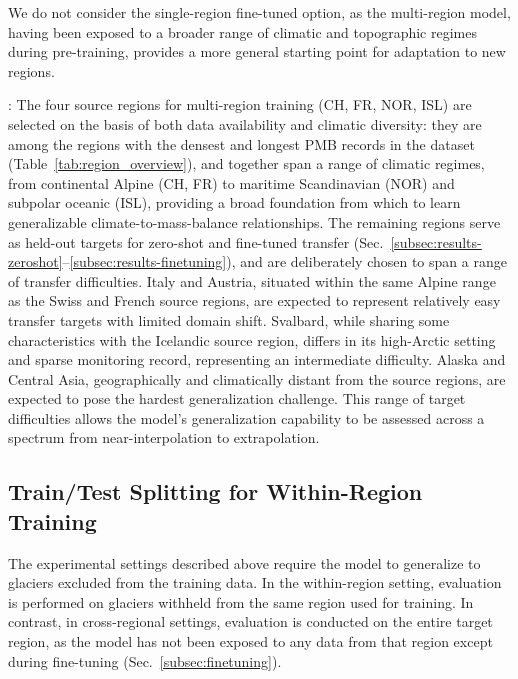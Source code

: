 \documentclass[draft]{agujournal2019}
\begin{document}
We do not consider the single-region fine-tuned option, as the multi-region model, having been exposed to a broader range of climatic and topographic regimes during pre-training, provides a more general starting point for adaptation to new regions.


: The four source regions for multi-region training (CH, FR, NOR, ISL) are selected on the basis of both data availability and climatic diversity: they are among the regions with the densest and longest PMB records in the dataset (Table~\ref{tab:region_overview}), and together span a range of climatic regimes, from continental Alpine (CH, FR) to maritime Scandinavian (NOR) and subpolar oceanic (ISL), providing a broad foundation from which to learn generalizable climate-to-mass-balance relationships. The remaining regions serve as held-out targets for zero-shot and fine-tuned transfer (Sec.~\ref{subsec:results-zeroshot}--\ref{subsec:results-finetuning}), and are deliberately chosen to span a range of transfer difficulties. Italy and Austria, situated within the same Alpine range as the Swiss and French source regions, are expected to represent relatively easy transfer targets with limited domain shift. Svalbard, while sharing some characteristics with the Icelandic source region, differs in its high-Arctic setting and sparse monitoring record, representing an intermediate difficulty. Alaska and Central Asia, geographically and climatically distant from the source regions, are expected to pose the hardest generalization challenge. This range of target difficulties allows the model's generalization capability to be assessed across a spectrum from near-interpolation to extrapolation. 


\subsection{Train/Test Splitting for Within-Region Training}\label{subsec:splitting}

The experimental settings described above require the model to generalize to glaciers excluded from the training data. In the within-region setting, evaluation is performed on glaciers withheld from the same region used for training. In contrast, in cross-regional settings, evaluation is conducted on the entire target region, as the model has not been exposed to any data from that region except during fine-tuning (Sec.~\ref{subsec:finetuning}).
\end{document}
